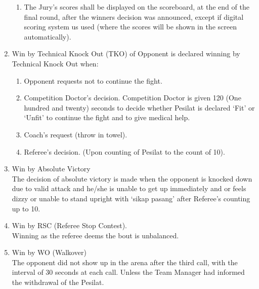 \begin{legal}
\begin{legal}
\begin{legal}
\begin{enumerate}[label=\alph*.]
\begin{enumerate}[label*=\arabic*.]
                    \item The Jury’s scores shall be displayed on the scoreboard, at the end of the final
                        round, after the winners decision was announced, except if digital scoring system
                        us used (where the scores will be shown in the screen automatically).
                    \end{enumerate}

                \item Win by Technical Knock Out (TKO) of Opponent is declared winning by 
                    Technical Knock Out when:
                    \begin{enumerate}[label=\arabic*.]
                    \item Opponent requests not to continue the fight.
                    \item Competition Doctor’s decision. Competition Doctor is given 120 (One hundred
                        and twenty) seconds to decide whether Pesilat is declared ‘Fit’ or ‘Unfit’ to
                        continue the fight and to give medical help.
                    \item Coach’s request (throw in towel).
                    \item Referee’s decision. (Upon counting of Pesilat to the count of 10).
                    \end{enumerate}

                \item  Win by Absolute Victory\\
                    The decision of absolute victory is made when the opponent is knocked down due to
                    valid attack and he/she is unable to get up immediately and or feels dizzy or unable to
                    stand upright with `sikap pasang' after Referee’s counting up to 10.

                \item Win by RSC (Referee Stop Contest). \\
                    Winning as the referee deems the bout is unbalanced.

                \item Win by WO (Walkover) \\
                    The opponent did not show up in the arena after the third call, with the interval of 30
                    seconds at each call. Unless the Team Manager had informed the withdrawal of the
                    Pesilat.


\end{enumerate}
\end{legal}
\end{legal}
\end{legal}
